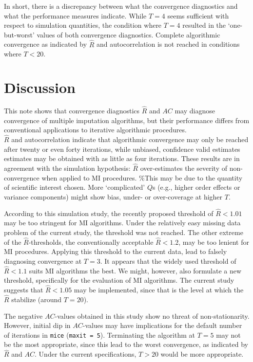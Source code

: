 \documentclass[
  Royal, times, sageapa]{sagej}
\begin{document}
In short, there is a discrepancy between what the convergence
diagnostics and what the performance measures indicate. While \(T=4\)
seems sufficient with respect to simulation quantities, the condition
where \(T=4\) resulted in the `one-but-worst' values of both convergence
diagnostics. Complete algorithmic convergence as indicated by
\(\widehat{R}\) and autocorrelation is not reached in conditions where
\(T<20\).

\hypertarget{discussion}{%
\section{Discussion}\label{discussion}}

This note shows that convergence diagnostics \(\widehat{R}\) and \(AC\)
may diagnose convergence of multiple imputation algorithms, but their
performance differs from conventional applications to iterative
algorithmic procedures.\\
\(\widehat{R}\) and autocorrelation indicate that algorithmic
convergence may only be reached after twenty or even forty iterations,
while unbiased, confidence valid estimates estimates may be obtained
with as little as four iterations. These results are in agreement with
the simulation hypothesis: \(\widehat{R}\) over-estimates the severity
of non-convergence when applied to MI procedures. \%This may be due to
the quantity of scientific interest chosen. More `complicated' \(Q\)s
(e.g., higher order effects or variance components) might show bias,
under- or over-coverage at higher \(T\).

According to this simulation study, the recently proposed threshold of
\(\widehat{R}<1.01\) may be too stringent for MI algorithms. Under the
relatively easy missing data problem of the current study, the threshold
was not reached. The other extreme of the \(\widehat{R}\)-thresholds,
the conventionally acceptable \(\widehat{R} <1.2\), may be too lenient
for MI procedures. Applying this threshold to the current data, lead to
falsely diagnosing convergence at \(T = 3\). It appears that the widely
used threshold of \(\widehat{R} < 1.1\) suits MI algorithms the best. We
might, however, also formulate a new threshold, specifically for the
evaluation of MI algorithms. The current study suggests that
\(\widehat{R} < 1.05\) may be implemented, since that is the level at
which the \(\widehat{R}\) stabilize (around \(T = 20\)).

The negative \(AC\)-values obtained in this study show no threat of
non-stationarity. However, initial dip in \(AC\)-values may have
implications for the default number of iterations in \texttt{mice}
(\texttt{maxit\ =\ 5}). Terminating the algorithm at \(T=5\) may not be
the most appropriate, since this lead to the worst convergence, as
indicated by \(\widehat{R}\) and \(AC\). Under the current
specifications, \(T>20\) would be more appropriate.
\end{document}
